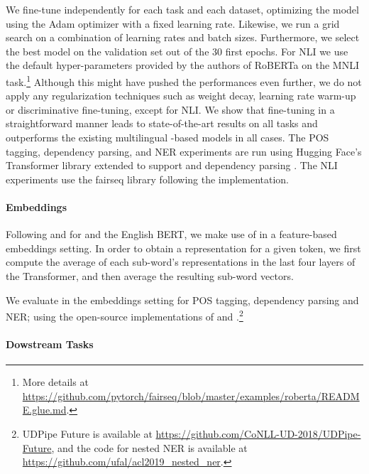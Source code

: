 We fine-tune \camembert independently for each task and each dataset, optimizing the model using the Adam optimizer \citep{kingma-ba-2015-adam} with a fixed learning rate. Likewise, we run a grid search on a combination of learning rates and batch sizes. Furthermore, we select the best model on the validation set out of the 30 first epochs. For NLI we use the default hyper-parameters provided by the authors of RoBERTa on the MNLI task.\footnote{More details at \url{https://github.com/pytorch/fairseq/blob/master/examples/roberta/README.glue.md}.} Although this might have pushed the performances even further, we do not apply any regularization techniques such as weight decay, learning rate warm-up or discriminative fine-tuning, except for NLI. We show that fine-tuning \camembert in a straightforward manner leads to state-of-the-art results on all tasks and outperforms the existing multilingual \bert-based models in all cases. The POS tagging, dependency parsing, and NER experiments are run using Hugging Face's Transformer library extended to support \camembert and dependency parsing \citep{wolf-etal-2019-huggingface}. The NLI experiments use the fairseq library following the \roberta implementation.

\paragraph{Embeddings}

Following \citet{strakova-etal-2019-neural} and \citet{straka-strakova-2019-evaluating} for \mbert and the English BERT, we make use of \camembert in a feature-based embeddings setting. In order to obtain a representation for a given token, we first compute the average of each sub-word’s representations in the last four layers of the Transformer, and then average the resulting sub-word vectors.

We evaluate \camembert in the embeddings setting for POS tagging, dependency parsing and NER; using the open-source implementations of \citet{straka-strakova-2019-evaluating} and \citet{strakova-etal-2019-neural}.\footnote{UDPipe Future is available at \url{https://github.com/CoNLL-UD-2018/UDPipe-Future}, and the code for nested NER is available at \url{https://github.com/ufal/acl2019_nested_ner}.}


\paragraph{Dowstream Tasks}


